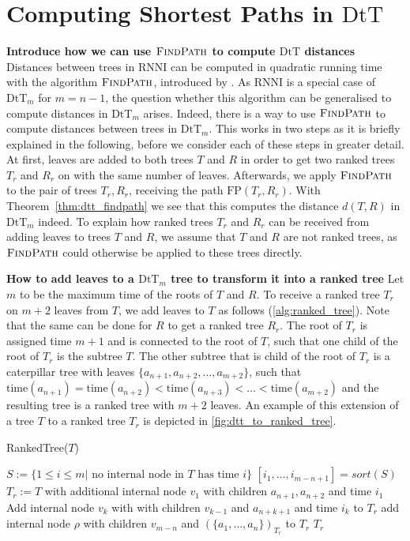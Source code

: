 \documentclass[11pt]{amsart}
\newcommand{\rnni}{\mathrm{RNNI}}
\newcommand{\findpath}{\textsc{FindPath}}
\newcommand{\ntime}{\mathrm{time}}
\newcommand{\fp}{\mathrm{FP}}
\newcommand{\dtt}{\mathrm{DtT}}
\newcommand{\summary}[1]{\textbf{#1}} %
\begin{document}
\section{Computing Shortest Paths in $\dtt$}

\todo{Do we want $\dtt$ or $\dtt_m$ in the titles of sections?}

\summary{Introduce how we can use $\findpath$ to compute $\dtt$ distances}
Distances between trees in $\rnni$ can be computed in quadratic running time with the algorithm $\findpath$, introduced by \textcite{Collienne2020-iu}.
As $\rnni$ is a special case of $\dtt_m$ for $m = n-1$, the question whether this algorithm can be generalised to compute distances in $\dtt_m$ arises.
Indeed, there is a way to use $\findpath$ to compute distances between trees in $\dtt_m$.
This works in two steps as it is briefly explained in the following, before we consider each of these steps in greater detail.
At first, leaves are added to both trees $T$ and $R$ in order to get two ranked trees $T_r$ and $R_r$ on with the same number of leaves.
Afterwards, we apply $\findpath$ to the pair of trees $T_r,R_r$, receiving the path $\fp(T_r,R_r)$.
With Theorem~\ref{thm:dtt_findpath} we see that this computes the distance $d(T,R)$ in $\dtt_m$ indeed.
To explain how ranked trees $T_r$ and $R_r$ can be received from adding leaves to trees $T$ and $R$, we assume that $T$ and $R$ are not ranked trees, as $\findpath$ could otherwise be applied to these trees directly.

\summary{How to add leaves to a $\dtt_m$ tree to transform it into a ranked tree}
Let $m$ to be the maximum time of the roots of $T$ and $R$.
To receive a ranked tree $T_r$ on $m+2$ leaves from $T$, we add leaves to $T$ as follows (\autoref{alg:ranked_tree}).
Note that the same can be done for $R$ to get a ranked tree $R_r$.
The root of $T_r$ is assigned time $m + 1$ and is connected to the root of $T$, such that one child of the root of $T_r$ is the subtree $T$.
The other subtree that is child of the root of $T_r$ is a caterpillar tree with leaves $\{a_{n+1}, a_{n+2}, \ldots, a_{m+2}\}$, such that $\ntime(a_{n+1}) = \ntime(a_{n+2}) < \ntime(a_{n+3}) < \ldots < \ntime(a_{m+2})$ and the resulting tree is a ranked tree with $m+2$ leaves.
An example of this extension of a tree $T$ to a ranked tree $T_r$ is depicted in \autoref{fig:dtt_to_ranked_tree}.

\begin{algorithm}[ht]
	\caption{RankedTree($T$)}
	\label{alg:ranked_tree}
	\begin{algorithmic}[1]
		\STATE $S:= \{1 \leq i \leq m | \text{ no internal node in } T \text{ has time } i\}$
		\STATE $[i_1, \ldots, i_{m-n+1}] = sort(S)$
		\STATE $T_r := T$ with additional internal node $v_1$ with children $a_{n+1}, a_{n+2}$ and time $i_1$
			\STATE Add internal node $v_k$ with with children $v_{k-1}$ and $a_{n+k+1}$ and time $i_k$ to $T_r$
		\STATE add internal node $\rho$ with children $v_{m-n}$ and $(\{a_1, \ldots, a_n\})_{T_r}$ to $T_r$
		\ENDFOR
		\RETURN $T_r$
	\end{algorithmic}
\end{algorithm}
\end{document}
